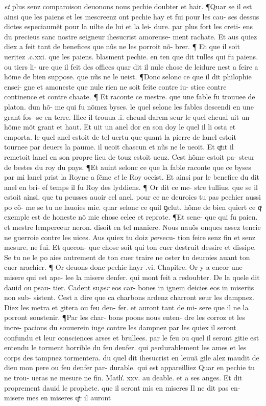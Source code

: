 \documentclass{article}
\begin{document}
\begin{pages}
\textit{et} plus senz comparoison deuonons nous pechie doubter et hair. ¶Quar se il est ainsi que les paiens et les mescreenz ont pechie hay et fui pour les cau- ses dessus dictes especiaumẽt pour la uilte de lui et la lei- dure. par plus fort les creti- ens du precieus sanc nostre seigneur ihesucrist amoreuse- ment rachate. Et aus quiez diex a feit tant de benefices que nũs ne les porroit nõ- brer. ¶ Et que il soit ueritez .c.xxi. que les paiens. blasment pechie. en ten que dit tulles qui fu paiens. ou tiers li- ure que il feit des offices quar dit il nule chose de leidure nest a feire a hõme de bien suppose. que nũs ne le ueist. ¶Donc selonc ce que il dit philophie ensei- gne et amoneste que nule rien ne soit feite contre iu- stice contre continence et contre chaate. ¶ Et raconte ce mestre. que une fable fu trouuee de platon. dun hõ- me qui fu nõmez byses. le quel selonc les fables descendi en une grant fos- se en terre. Illec il trouua .i. cheual darem seur le quel cheual uit un hõme mõt grant et haut. Et uit un anel dor en son doy le quel il li osta et emporta. le quel anel estoit de tel uertu que quant la pierre de lanel estoit tournee par deuers la paume. il ueoit chascun et nũs ne le ueoit. Et qͣnt il remetoit lanel en son propre lieu de touz estoit ueuz. Cest hõme estoit pa- steur de bestes du roy du pays. ¶Et auint selonc ce que la fable raconte que ce byses par mi lanel prist la Royne a fẽme \textit{et} le Roy occist. Et ainsi par le benefice du dit anel en bri- ef temps il fu Roy des lyddiens. ¶ Or dit ce me- stre tullius. que se il estoit ainsi. que tu peusses auoir cel anel. pour ce ne deuroies tu pas pechier aussi po cõ- me se tu ne lauoies mie. quar selonc ce quil ꝯclut. hõme de bien quiert ce qͥ exemple est de honeste nõ mie chose celee et reprote. ¶Et sene- que qui fu paien. et mestre lempereeur neron. disoit en tel maniere. Nous nauõs onques assez tencie ne guerroie contre les uices. Aus quiex tu doiz \textit{per}secu- tion feire senz fin et senz mesure. ne fui. Et quecon- que chose soit qui ton cuer destruit dessire et dissipe. Se tu ne le po aies autrement de ton cuer traire ne oster tu deuroies auant ton cuer arachier. ¶ Or deuons donc pechie hayr .vi. Chapitre. Or y a encor une misere qui est ape- lee la misere denfer. qui mont feit a redoubter. De la quele dit dauid ou psau- tier. Cadent su\textit{per} eos car- bones in ignem deicies eos in miseriis non sub- sistent. Cest a dire que ca charbons ardenz charront seur les dampnez. Diex les metra et gitera ou feu den- fer. et auront tant de mi- sere que il ne la porront soustenir. ¶Par les char- bons poons nous enten- dre les corroz et les incre- pacions du souuerein iuge contre les dampnez par les quiex il seront confundu et leur consciences arses et brullees. par le feu ou quel il seront gitie est entendu le torment horrible du feu denfer. qui \textit{per}durablement les ames et les corps des tampnez tormentera. du quel dit ihesucrist en leuuã gile alez maudit de dieu mon pere ou feu denfer par- durable. qui est appareilliez Quar en pechie tu ne trou- ueras ne mesure ne fin. Math̾. xxv. au deable. et a ses anges. Et dit proprement dauid le prophete. que il seront mis en miseres Il ne dit pas en- misere mes en miseres qͣr il auront 
\end{pages}
\end{document}
